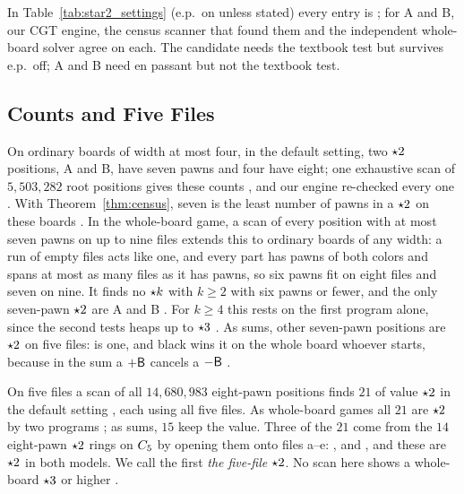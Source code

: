 In Table~\ref{tab:star2_settings} (e.p.\ on unless stated) every entry is ; for A and B, our CGT
engine, the census scanner that found them and the independent whole-board solver agree on each. The candidate
needs the textbook test but survives e.p.\ off; A and B need en passant but not the textbook test.

\subsection{Counts and Five Files}\label{sec:star2-five}

On ordinary boards of width at most four, in the default setting, two $\mathord{\star2}$ positions, A and B, have seven pawns
and four have eight; one exhaustive scan of $5{,}503{,}282$ root positions gives these counts , and our
engine re-checked every one . With
Theorem~\ref{thm:census}, seven is the least number of pawns in a $\mathord{\star2}$ on these boards . In the
whole-board game, a scan of every position with at most seven pawns on up to nine files extends this to ordinary
boards of any width: a run of empty files acts like one, and every part has pawns of both colors and spans at most
as many files as it has pawns, so six pawns fit on eight files and seven on nine. It finds no $\mathord{\star k}$ with $k\ge2$ with six pawns or fewer, and the only seven-pawn $\mathord{\star2}$ are A and
B . For $k\ge4$ this rests on the first program alone, since the second tests heaps up to $\mathord{\star3}$ . As sums, other seven-pawn positions are $\mathord{\star2}$ on five files:  is one, and black wins it on the whole board whoever starts, because in the sum a $+\mathsf{B}$ cancels a $-\mathsf{B}$ .

On five files a scan of all $14{,}680{,}983$ eight-pawn positions finds $21$ of value $\mathord{\star2}$ in the default
setting , each using all five files. As whole-board games all $21$ are $\mathord{\star2}$ by two programs ;
as sums, $15$ keep the value. Three of the
$21$ come from the $14$ eight-pawn $\mathord{\star2}$ rings on $C_{5}$  by opening them onto files a--e:
,  and
,
and these are $\mathord{\star2}$ in both models. We call the first \emph{the five-file $\mathord{\star2}$}. No scan here shows a whole-board $\mathord{\star3}$ or higher
.

